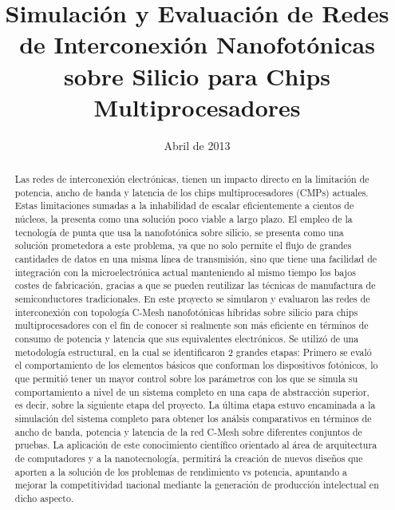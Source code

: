 \documentclass{IEEEtran}
\begin{document}
\title{Simulación y Evaluación de Redes de
Interconexión Nanofotónicas sobre Silicio
para Chips Multiprocesadores}
\date {Abril de 2013}
\author{
}
\maketitle


\begin{abstract}
Las redes de interconexión electrónicas, tienen un impacto directo en 
la limitación de potencia, ancho de banda y latencia de los
chips multiprocesadores (CMPs) actuales. 
Estas limitaciones sumadas a la inhabilidad de escalar eficientemente a cientos de
núcleos, la presenta como una solución poco viable a largo plazo.
El empleo de la tecnología de punta que usa la nanofotónica sobre silicio, 
se presenta como una solución prometedora a este
problema, ya que no solo permite el flujo de grandes cantidades de 
datos en una misma línea de transmisión, sino que tiene una facilidad de 
integración con la microelectrónica actual manteniendo al mismo tiempo los 
bajos costes de fabricación, gracias a que se pueden reutilizar las técnicas 
de manufactura de semiconductores tradicionales.
En este proyecto se simularon y evaluaron las redes de interconexión con 
topología C-Mesh nanofotónicas híbridas sobre silicio para chips multiprocesadores 
con el fin de conocer si realmente son más eficiente en términos de consumo de potencia
 y latencia que sus equivalentes electrónicos.
Se utilizó de una metodología estructural, 
en la cual se identificaron 2 grandes etapas: 
Primero se evaló el comportamiento de los elementos básicos que conforman
los dispositivos fotónicos, lo que  permitió tener un
mayor control sobre los parámetros con los que se simula su comportamiento a nivel
de un sistema completo en una capa de abstracción superior, es decir, sobre la siguiente
etapa del proyecto.
La última etapa estuvo encaminada a la simulación del sistema completo para
obtener los análsis comparativos 
en términos de ancho de banda, 
potencia y latencia de la red C-Mesh sobre diferentes conjuntos de pruebas. 
La aplicación de este conocimiento 
científico orientado al área de arquitectura de computadores y a la nanotecnología, 
permitirá la creación de nuevos diseños que aporten a la solución de los
problemas de rendimiento vs potencia, apuntando a mejorar la competitividad 
nacional mediante la generación de producción intelectual en dicho aspecto.
\end{abstract}
\end{document}
